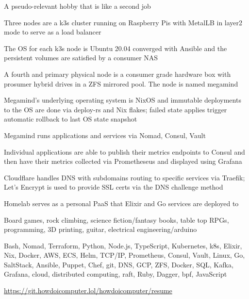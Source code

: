 \begin{cventries}
  \cventry
    {A pseudo-relevant hobby that is like a second job}
    {}
    {}
    {}
    {
      \begin{cvitems}
        \item {Three nodes are a k3s cluster running on Raspberry Pis with MetalLB in layer2 mode to serve as a load balancer}
        \item {The OS for each k3s node is Ubuntu 20.04 converged with Ansible and the persistent volumes are satisfied by a consumer NAS}
        \item {A fourth and primary physical node is a consumer grade hardware box with prosumer hybrid drives in a ZFS mirrored pool. The node is named megamind}
        \item {Megamind's underlying operating system is NixOS and immutable deployments to the OS are done via deploy-rs and Nix flakes; failed state applies trigger automatic rollback to last OS state snapshot}
        \item {Megamind runs applications and services via Nomad, Consul, Vault}
        \item {Individual applications are able to publish their metrics endpoints to Consul and then have their metrics collected via Prometheseus and displayed using Grafana}
        \item {Cloudflare handles DNS with subdomains routing to specific services via Traefik; Let's Encrypt is used to provide SSL certs via the DNS challenge method}
        \item {Homelab serves as a personal PaaS that Elixir and Go services are deployed to}
      \end{cvitems}
    }
\end{cventries}

\begin{cventries}
  \cventry
    {}
    {}
    {}
    {}
    {
      \begin{cvitems}
        \item {Board games, rock climbing, science fiction/fantasy books, table top RPGs, programming, 3D printing, guitar, electrical engineering/arduino}
      \end{cvitems}
    }
\end{cventries}

\begin{cventries}
  \cventry
    {}
    {}
    {}
    {}
    {
      \begin{cvitems}
        \item {Bash, Nomad, Terraform, Python, Node.js, TypeScript, Kubernetes, k8s, Elixir, Nix, Docker, AWS, ECS, Helm, TCP/IP, Prometheus, Consul, Vault, Linux, Go, SaltStack, Ansible, Puppet, Chef, git, DNS, GCP, ZFS, Docker, SQL, Kafka, Grafana, cloud, distributed computing, raft, Ruby, Dagger, bpf, JavaScript}
      \end{cvitems}
    }
\end{cventries}

\begin{cventries}
  \cventry
    {}
    {}
    {}
    {}
    {
      \begin{cvitems}
        \item \href{https://git.howdoicomputer.lol/howdoicomputer/resume}{https://git.howdoicomputer.lol/howdoicomputer/resume}
      \end{cvitems}
    }
\end{cventries}
